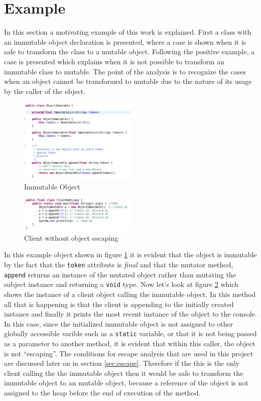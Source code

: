 \section{Example}\label{sec:example}
In this section a motivating example of this work is explained. First a class with an immutable object declaration is presented, where a case is shown when it is safe to transform the class to a mutable object. Following the positive example, a case is presented which explains when it is not possible to transform an immutable class to mutable. The point of the analysis is to recognize the cases when an object cannot be transformed to mutable due to the nature of its usage by the caller of the object.

\begin{figure}[H]
	\caption{Immutable Object} \label{fig:immutable_object}
	\includegraphics[width=0.5\textwidth]{img/immutable_object}
\end{figure}

\begin{figure}[H]
	\caption{Client without object escaping} \label{fig:clientNoEscape}
	\includegraphics[width=0.5\textwidth]{img/client_noescape}
\end{figure}

In this example object shown in figure \ref{fig:immutable_object} it is evident that the object is immutable by the fact that the \texttt{token} attribute is \textit{final} and that the mutator method, \texttt{append\(\)} returns an instance of the mutated object rather than mutating the subject instance and returning a \texttt{void} type. Now let's look at figure \ref{fig:clientNoEscape} which shows the instance of a client object calling the immutable object. In this method all that is happening is that the client is appending to the initially created instance and finally it prints the most recent instance of the object to the console. In this case, since the initialized immutable object is not assigned to other globally accessible varible such as a \texttt{static} variable, or that it is not being passed as a parameter to another method, it is evident that within this caller, the object is not ``escaping''. The conditions for escape analysis that are used in this project are discussed later on in section \ref{sec:escape}.
Therefore if the this is the only client calling the the immutable object then it would be safe to transform the immutable object to an mutable object, because a reference of the object is not assigned to the heap before the end of execution of the method.

